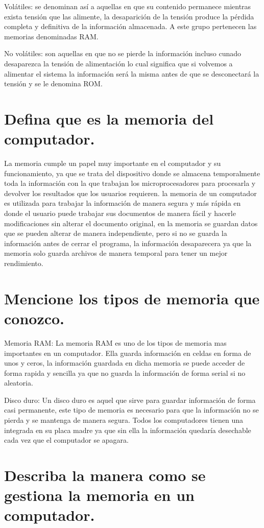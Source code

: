 \documentclass{article}
\begin{document}
Volátiles: se denominan así a aquellas en que su contenido permanece mientras exista tensión que las alimente, la desaparición de la tensión produce la pérdida completa y definitiva de la información almacenada. A este grupo pertenecen las memorias denominadas RAM.

No volátiles: son aquellas en que no se pierde la información incluso cunado desaparezca la tensión de alimentación lo cual significa que si volvemos a alimentar el sistema la información será la misma antes de que se desconectará la tensión y se le denomina ROM.


\section{Defina que es la memoria del computador.}
La memoria cumple un papel muy importante en el computador y su funcionamiento, ya que se trata del dispositivo donde se almacena temporalmente toda la información con la que trabajan
los microprocesadores para procesarla y devolver los resultados que los usuarios requieren.
la memoria de un computador es utilizada para trabajar la información de manera segura y más rápida en donde el usuario puede trabajar sus documentos de manera fácil y hacerle modificaciones sin alterar el documento original, en la memoria se guardan datos que se pueden alterar de manera independiente, pero si no se guarda la información antes de cerrar el programa, la información desaparecera ya que la memoria solo guarda archivos de manera temporal para tener un mejor rendimiento.

\section{Mencione los tipos de memoria que conozco.} \label{contenido}
Memoria RAM: La memoria RAM es uno de los tipos de memoria mas
importantes en un computador. Ella guarda información en celdas en forma de unos y ceros, la información guardada en dicha memoria se puede acceder de forma rapida y sencilla ya que no guarda la información de forma serial si no
aleatoria.

Disco duro: Un disco duro es aquel que sirve para guardar información de forma casi permanente, este tipo de memoria es necesario para que la información no se pierda y se mantenga de manera segura. Todos los computadores
tienen una integrada en su placa madre ya que sin ella la información quedaría desechable cada vez que el computador se apagara.


\section{Describa la manera como se gestiona la memoria en un computador.}
\end{document}
